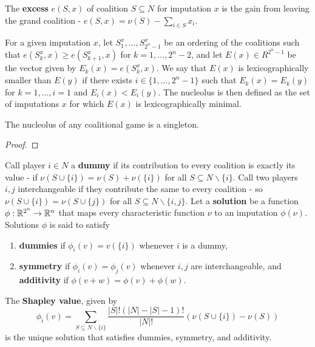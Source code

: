 \begin{defn}
  \label{sec:cooperative-games-5}
  The \textbf{excess} $e(S, x)$ of coalition $S \subseteq N$ for
  imputation $x$ is the gain from leaving the grand coalition - $e(S,
  x) = \nu(S) - \sum_{i \in S}^{} x_{i}$.

  For a given imputation $x$, let $S_{1}^{x}, \dots, S_{2^{n}-1}^{x}$
  be an ordering of the coalitions such that $e(S^{x}_{k}, x) \geq
  e(S_{k+1}^{x}, x)$ for $k = 1, \dots, 2^{n} - 2$, and let $E(x) \in
  R^{2^{n} - 1}$ be the vector given by $E_{k}(x) = e(S_{k}^{x}, x)$.
  We say that $E(x)$ is lexicographically smaller than $E(y)$ if there
  exists $i \in \{ 1, \dots, 2^{n} - 1 \} $ such that $E_{k}(x) =
  E_{k}(y)$ for $k = 1, \dots, i=1$ and $E_{i} (x) < E_{i}(y)$. The
  nucleolus is then defined as the set of imputations $x$ for which
  $E(x)$ is lexicographically minimal.
\end{defn}

\begin{thm}
  \label{sec:cooperative-games-6}
  The nucleolus of any coalitional game is a singleton.
\end{thm}

\begin{proof}
\end{proof}

\begin{defn}
  \label{sec:cooperative-games-7}
  Call player $i \in N$ a \textbf{dummy} if its contribution to every
  coalition is exactly its value - if $\nu(S \cup \{ i \} ) = \nu(S) +
  \nu(\{ i \} )$ for all $S \subseteq N \backslash \{ i \} $. Call two
  players $i, j$ interchangeable if they contribute the same to every
  coalition - so $\nu(S \cup \{ i \} ) = \nu(S \cup \{ j \} )$ for all
  $S \subseteq N \backslash \{ i, j \} $. Let a \textbf{solution} be a
  function $\phi: \mathbb{R}^{2^{n}} \rightarrow \mathbb{R}^{n}$ that maps every
  characteristic function $\nu$ to an imputation $\phi(\nu)$.
  Solutions $\phi$ is said to satisfy
  \begin{enumerate}
  \item \textbf{dummies} if $\phi_{i}(v) = v(\{ i \} )$ whenever $i$
    is a dummy,
  \item \textbf{symmetry} if $\phi_{i}(v) = \phi_{j}(v)$ whenever $i,
    j$ are interchangeable, and \textbf{additivity} if $\phi(v + w) =
    \phi(v) + \phi(w)$.
  \end{enumerate}
\end{defn}
\begin{thm}
  \label{sec:cooperative-games-8}
  The \textbf{Shapley value}, given by
  \begin{equation}
    \label{eq:21}
    \phi_{i}(v) = \sum_{S \subseteq N \backslash \{ i \} }^{}
    \frac{|S|!(|N| - |S| - 1)!}{|N|!} (\nu(S \cup \{ i \} ) - \nu(S))
  \end{equation} is the unique solution that satisfies dummies,
  symmetry, and additivity.
\end{thm}

